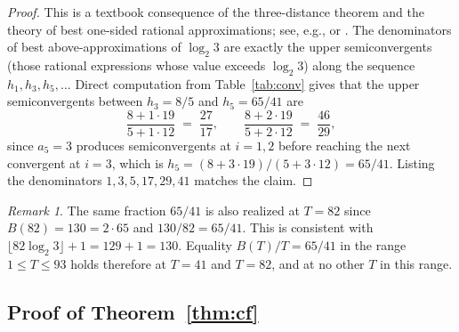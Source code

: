 \documentclass[11pt,a4paper]{article}
\theoremstyle{definition}
\theoremstyle{remark}
\newtheorem{remark}[theorem]{Remark}
\begin{document}
\begin{proof}
This is a textbook consequence of the three-distance theorem and the
theory of best one-sided rational approximations; see, e.g.,
\cite[\S 5--6]{Khinchin1964} or \cite[Ch.~6]{Bugeaud2004}.  The
denominators of best above-approximations of $\log_2 3$ are exactly
the upper semiconvergents (those rational expressions whose value
exceeds $\log_2 3$) along the sequence
$h_{1}, h_{3}, h_{5}, \ldots$  Direct computation from
Table~\ref{tab:conv} gives that the upper semiconvergents between
$h_3 = 8/5$ and $h_5 = 65/41$ are
\[
  \frac{8 + 1 \cdot 19}{5 + 1 \cdot 12} \;=\; \frac{27}{17},
  \qquad
  \frac{8 + 2 \cdot 19}{5 + 2 \cdot 12} \;=\; \frac{46}{29},
\]
since $a_5 = 3$ produces semiconvergents at $i = 1, 2$ before
reaching the next convergent at $i = 3$, which is
$h_5 = (8 + 3 \cdot 19)/(5 + 3 \cdot 12) = 65/41$.  Listing the
denominators $1, 3, 5, 17, 29, 41$ matches the claim.
\end{proof}

\begin{remark}\label{rem:T82}
The same fraction $65/41$ is also realized at $T = 82$ since
$B(82) = 130 = 2 \cdot 65$ and $130/82 = 65/41$.  This is consistent
with $\lfloor 82 \log_2 3 \rfloor + 1 = 129 + 1 = 130$.  Equality
$B(T)/T = 65/41$ in the range $1 \leq T \leq 93$ holds therefore at
$T = 41$ and $T = 82$, and at no other $T$ in this range.
\end{remark}

\subsection{Proof of Theorem~\ref{thm:cf}}
\end{document}
